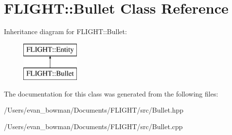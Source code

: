 \hypertarget{class_f_l_i_g_h_t_1_1_bullet}{}\section{F\+L\+I\+G\+HT\+:\+:Bullet Class Reference}
\label{class_f_l_i_g_h_t_1_1_bullet}
Inheritance diagram for F\+L\+I\+G\+HT\+:\+:Bullet\+:\begin{figure}[H]
\begin{center}
\leavevmode
\includegraphics[height=2.000000cm]{class_f_l_i_g_h_t_1_1_bullet}
\end{center}
\end{figure}


The documentation for this class was generated from the following files\+:\begin{DoxyCompactItemize}
\item 
/\+Users/evan\+\_\+bowman/\+Documents/\+F\+L\+I\+G\+H\+T/src/Bullet.\+hpp\item 
/\+Users/evan\+\_\+bowman/\+Documents/\+F\+L\+I\+G\+H\+T/src/Bullet.\+cpp\end{DoxyCompactItemize}
